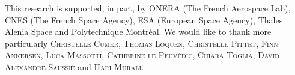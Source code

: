 \documentclass[smallcondensed]{svjour3}     %
\begin{document}
\FloatBarrier

\begin{acknowledgements}
This research is supported, in part, by ONERA (The French Aerospace Lab), CNES (The French Space Agency), ESA (European Space Agency), Thales Alenia Space and Polytechnique Montréal. We would like to thank more particularly \textsc{Christelle Cumer}, \textsc{Thomas Loquen}, \textsc{Christelle Pittet}, \textsc{Finn Ankersen}, \textsc{Luca Massotti}, \textsc{Catherine le Peuvédic}, \textsc{Chiara Toglia}, \textsc{David-Alexandre Saussié} and \textsc{Hari Murali}.
\end{acknowledgements}

\end{document}
